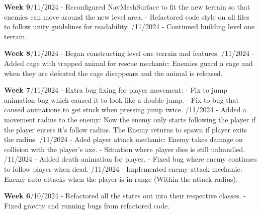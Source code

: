 \documentclass[]{final_report}
\begin{document}
\textbf{Week 9}/11/2024
\newline- Reconfigured NavMeshSurface to fit the new terrain so that enemies can move around the new level area.
\newline- Refactored code style on all files to follow unity guidelines for readability.
/11/2024
\newline- Continued building level one terrain.

\textbf{Week 8}/11/2024
\newline- Began constructing level one terrain and features.
/11/2024
\newline- Added cage with trapped animal for rescue mechanic: Enemies guard a cage and when they are defeated the cage disappears and the animal is released.

\textbf{Week 7}/11/2024
\newline- Extra bug fixing for player movement:
\newline- Fix to jump animation bug which caused it to look like a double jump.
\newline- Fix to bug that caused animations to get stuck when pressing jump twice.
/11/2024
\newline- Added a movement radius to the enemy: Now the enemy only starts following the player if the player enters it's follow radius. The Enemy returns to spawn if player exits the radius.
/11/2024
\newline- Aded player attack mechanic: Enemy takes damage on collision with the player's axe.
\newline- Situation where player dies is still unhandled.
/11/2024
\newline- Added death animation for player.
\newline- Fixed bug where enemy continues to follow player when dead.
/11/2024
\newline- Implemented enemy attack mechanic: Enemy auto attacks when the player is in range (Within the attack radius).

\textbf{Week 6}/10/2024
\newline- Refactored all the states out into their respective classes.
\newline- Fixed gravity and running bugs from refactored code.
\end{document}
